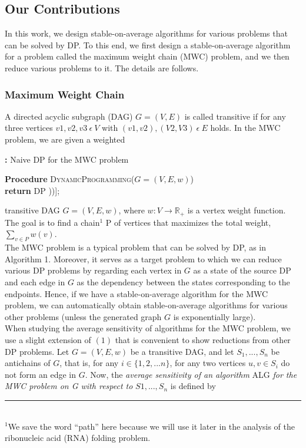 \documentclass[preprint, 11pt]{article}
\begin{document}
\subsection{Our Contributions}
In this work, we design stable-on-average algorithms for various problems that can be solved by
DP. To this end, we first design a stable-on-average algorithm for a problem called the maximum
weight chain (MWC) problem, and we then reduce various problems to it. The details are follows.

\subsubsection{Maximum Weight Chain}
A directed acyclic subgraph (DAG) $G = (V, E)$ is called transitive if for any three vertices $v1, v2, v3\  \epsilon\  V$ with $(v1, v2), (V2, V3)\  \epsilon \  E$ holds. In the MWC problem, we are given a weighted

\begin{algorithm}[H]
\caption{\textbf{: }Naive DP for the MWC problem}
\textbf{Procedure} \textsc{DynamicProgramming}($G = (V, E, w)$)
    \\
    \textnormal{\textbf{return} DP} \left[ \textnormal{argmax}_{v \in V} (w(\text{DP}[v]))\right];
\end{algorithm}

transitive DAG $G = (V,E,w)$, where $w: V \rightarrow \mathbb{R}_+$ is a vertex weight function. The goal is to find
a chain$^{1}$ P of vertices that maximizes the total weight, $\sum _{v\in P} w(v)$.\\
The MWC problem is a typical problem that can be solved by DP, as in Algorithm 1. Moreover,
it serves as a target problem to which we can reduce various DP problems by regarding each vertex in
$G$ as a state of the source DP and each edge in $G$ as the dependency between the states corresponding
to the endpoints. Hence, if we have a stable-on-average algorithm for the MWC problem, we can
automatically obtain stable-on-average algorithms for various other problems (unless the generated
graph $G$ is exponentially large).\\
When studying the average sensitivity of algorithms for the MWC problem, we use a slight
extension of $(1)$  that is convenient to show reductions from other DP problems. Let $G = (V,E,w)$ be a transitive DAG, and let $S_1,...,S_n$ be antichains of $G$, that is, for any $i\in \{1,2,...n\}$, for any two vertices $u, v \in S_i$ do not form an edge in $G$. Now, the \textit{average sensitivity of an algorithm} ALG \textit{for the MWC problem on G with respect to} $S1,...,S_n$ is defined by\\
\rule{0.45\textwidth}{0.3pt}\\
$^1$We save the word “path” here because we will use it later in the analysis of the ribonucleic acid (RNA) folding problem.
\end{document}

